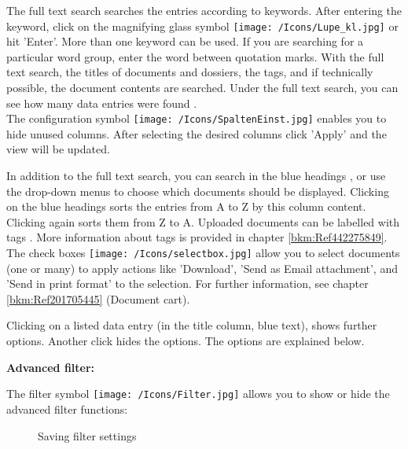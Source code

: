 The full text search  searches the entries according to keywords. After entering the keyword, click on the magnifying glass symbol \texttt{[image: /Icons/Lupe\_kl.jpg]}  or hit 'Enter'. More than one keyword can be used. If you are searching for a particular word group, enter the word between quotation marks. With the full text search, the titles of documents and dossiers, the tags, and if technically possible, the document contents are searched. Under the full text search, you can see how many data entries were found .\\
The configuration symbol \texttt{[image: /Icons/SpaltenEinst.jpg]}  enables you to hide unused columns. After selecting the desired columns click 'Apply' and the view will be updated.\newline

In addition to the full text search, you can search in the blue headings , or use the drop-down menus to choose which documents should be displayed. Clicking on the blue headings sorts the entries from A to Z by this column content. Clicking again sorts them from Z to A. Uploaded documents can be labelled with tags . More information about tags is provided in chapter \ref{bkm:Ref442275849}.\newline
The check boxes \texttt{[image: /Icons/selectbox.jpg]}  allow you to select documents (one or many) to apply actions like 'Download', 'Send as Email attachment', and 'Send in print format' to the selection. For further information, see chapter \ref{bkm:Ref201705445} (Document cart).

Clicking on a listed data entry  (in the title column, blue text), shows further options. Another click hides the options. The options are explained below.

\vspace{\baselineskip}

\textbf{Advanced filter:}\\
\label{bkm:Ref201704051}

The filter symbol \texttt{[image: /Icons/Filter.jpg]}  allows you to show or hide the advanced filter functions:

\begin{figure}[H]
\caption{Saving filter settings}
\end{figure}

